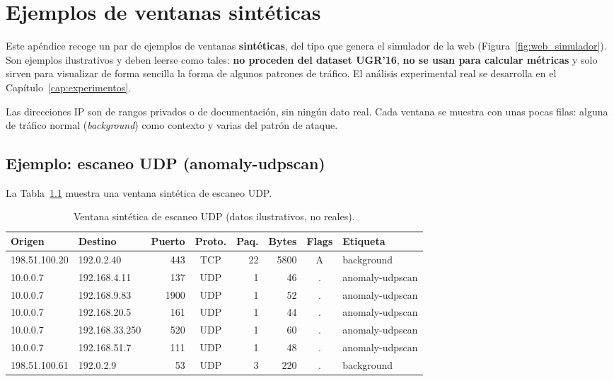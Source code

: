 \chapter{Ejemplos de ventanas sintéticas}
\label{ap:ejemplos_ventanas}

Este apéndice recoge un par de ejemplos de ventanas \textbf{sintéticas}, del tipo que genera el simulador de la web (Figura~\ref{fig:web_simulador}). Son ejemplos ilustrativos y deben leerse como tales: \textbf{no proceden del dataset UGR'16}, \textbf{no se usan para calcular métricas} y solo sirven para visualizar de forma sencilla la forma de algunos patrones de tráfico. El análisis experimental real se desarrolla en el Capítulo~\ref{cap:experimentos}.

Las direcciones IP son de rangos privados o de documentación, sin ningún dato real. Cada ventana se muestra con unas pocas filas: alguna de tráfico normal (\emph{background}) como contexto y varias del patrón de ataque.

\section{Ejemplo: escaneo UDP (anomaly-udpscan)}
\label{sec:ape_udpscan}

La Tabla~\ref{tab:ape_udpscan} muestra una ventana sintética de escaneo UDP.

\begin{table}[ht]
\centering
\small
\begin{tabular}{|l|l|r|c|r|r|c|l|}
\hline
\textbf{Origen} & \textbf{Destino} & \textbf{Puerto} & \textbf{Proto.} & \textbf{Paq.} & \textbf{Bytes} & \textbf{Flags} & \textbf{Etiqueta} \\
\hline
198.51.100.20 & 192.0.2.40 & 443 & TCP & 22 & 5800 & A & background \\
\hline
10.0.0.7 & 192.168.4.11 & 137 & UDP & 1 & 46 & . & anomaly-udpscan \\
\hline
10.0.0.7 & 192.168.9.83 & 1900 & UDP & 1 & 52 & . & anomaly-udpscan \\
\hline
10.0.0.7 & 192.168.20.5 & 161 & UDP & 1 & 44 & . & anomaly-udpscan \\
\hline
10.0.0.7 & 192.168.33.250 & 520 & UDP & 1 & 60 & . & anomaly-udpscan \\
\hline
10.0.0.7 & 192.168.51.7 & 111 & UDP & 1 & 48 & . & anomaly-udpscan \\
\hline
198.51.100.61 & 192.0.2.9 & 53 & UDP & 3 & 220 & . & background \\
\hline
\end{tabular}
\caption{Ventana sintética de escaneo UDP (datos ilustrativos, no reales).}
\label{tab:ape_udpscan}
\end{table}

